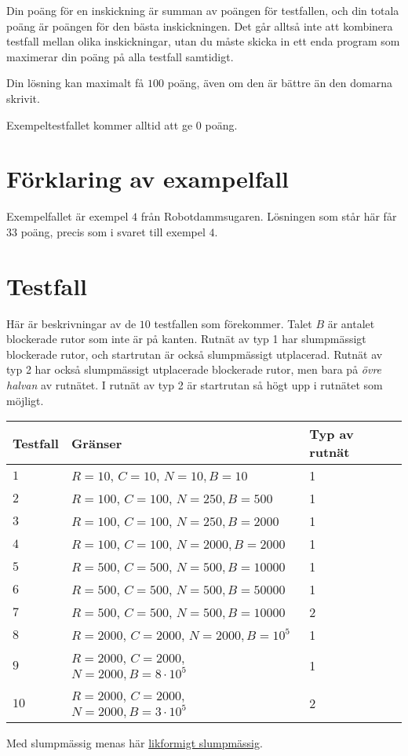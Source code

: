 Din poäng för en inskickning är summan av poängen för testfallen, och din totala poäng är poängen för den bästa inskickningen.
Det går alltså inte att kombinera testfall mellan olika inskickningar, utan du måste skicka in ett enda program som
maximerar din poäng på alla testfall samtidigt.

Din lösning kan maximalt få $100$ poäng, även om den är bättre än den domarna skrivit.

Exempeltestfallet kommer alltid att ge $0$ poäng.


\section*{Förklaring av exampelfall}
Exempelfallet är exempel $4$ från Robotdammsugaren. Lösningen som står här får $33$ poäng, precis
som i svaret till exempel $4$.

\section*{Testfall}
Här är beskrivningar av de $10$ testfallen som förekommer. Talet $B$ är antalet blockerade rutor som inte är på kanten.
Rutnät av typ 1 har slumpmässigt blockerade rutor, och startrutan är också slumpmässigt utplacerad.
Rutnät av typ 2 har också slumpmässigt utplacerade blockerade rutor, men bara på \textit{övre halvan}
av rutnätet. I rutnät av typ 2 är startrutan så högt upp i rutnätet som möjligt.

\noindent
\begin{tabular}{| l | l | l |}
\hline
Testfall & Gränser                                     & Typ av rutnät \\ \hline
$1$       & $R = 10$, $C = 10$, $N = 10, B = 10$           & 1  \\ \hline
$2$       & $R = 100$, $C = 100$, $N = 250, B = 500$         & 1   \\ \hline
$3$       & $R = 100$, $C = 100$, $N = 250, B = 2000$     & 1   \\ \hline
$4$       & $R = 100$, $C = 100$, $N = 2000, B = 2000$ & 1  \\ \hline
$5$       & $R = 500$, $C = 500$, $N = 500, B = 10000$    & 1   \\ \hline
$6$       & $R = 500$, $C = 500$, $N = 500, B = 50000$   & 1   \\ \hline
$7$       & $R = 500$, $C = 500$, $N = 500, B = 10000$    & 2   \\ \hline
$8$       & $R = 2000$, $C = 2000$, $N = 2000, B = 10^5$  & 1  \\ \hline
$9$       & $R = 2000$, $C = 2000$, $N = 2000, B = 8 \cdot 10^5$ & 1   \\ \hline
$10$      & $R = 2000$, $C = 2000$, $N = 2000, B = 3 \cdot 10^5$ & 2   \\ \hline
\end{tabular}

Med slumpmässig menas här \href{https://sv.wikipedia.org/wiki/Likformig_sannolikhetsf\%C3\%B6rdelning}{likformigt slumpmässig}. 
